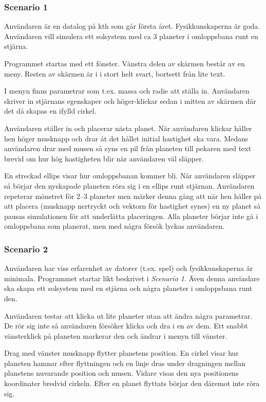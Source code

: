 \subsubsection*{Scenario 1}

Användaren är en datalog på kth som går första året.
Fysikkunskaperna är goda.
Användaren vill simulera ett solsystem med ca 3 planeter
i omloppsbana runt en stjärna.

Programmet startas med ett fönster.
Vänstra delen av skärmen består av en meny.
Resten av skärmen är i i stort helt svart, bortsett
från lite text.

I menyn finns parametrar som t.ex. massa och radie att ställa in.
Användaren skriver in stjärnans egenskaper och höger-klickar
sedan i mitten av skärmen där det då skapas en ifylld cirkel.

Användaren ställer in och placerar nästa planet.
När användaren klickar håller hen höger musknapp
och drar åt det hållet initial hastighet ska vara.
Medans användaren drar med musen så syns en pil från planeten till
pekaren med text brevid om hur hög hastigheten blir när användaren väl släpper.

En streckad ellips visar hur omloppsbanan kommer bli.
När användaren släpper så börjar den nyskapade planeten röra sig
i en ellips runt stjärnan.
Användaren repeterar mönstret för 2--3 planeter men märker denna gång
att när hen håller på att placera (musknapp nertryckt och vektorn
för hastighet synes) en ny planet så pausas simulationen för att
underlätta placeringen.
Alla planeter börjar inte gå i omloppsbana som planerat,
men med några försök lyckas användaren.

\subsubsection*{Scenario 2}

Användaren har viss erfarenhet av datorer (t.ex. spel) och
fysikkunskaperna är minimala.
Programmet startar likt beskrivet i \textit{Scenario 1}.
Även denna användare ska skapa ett solsystem med en stjärna
och några planeter i omloppsbana runt den.

Användaren testar att klicka ut lite planeter utan att ändra några parametrar.
De rör sig inte så användaren försöker klicka och dra i en av dem.
Ett snabbt vänsterklick på planeten markerar den och ändrar i menyn
till vänster.

Drag med vänster musknapp flytter planetens position.
En cirkel visar hur planeten hamnar efter flyttningen och en linje dras
under dragningen mellan planetens nuvarande position och musen.
Vidare visas den nya positionens koordinater bredvid cirkeln.
Efter en planet flyttats börjar den däremot inte röra sig.

